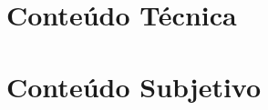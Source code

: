 \documentclass[12pt,a4paper]{report}
\begin{document}
	



\pagestyle{plain}



\tableofcontents
\listoffigures

\newpage


\part{Conteúdo Técnica}













\part{Conteúdo Subjetivo}



%

%
\end{document}
